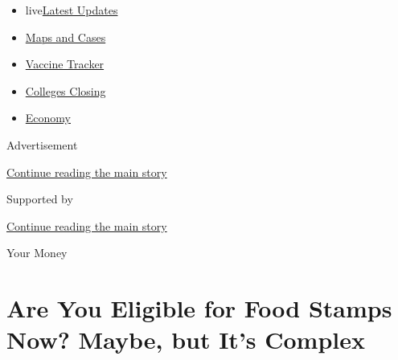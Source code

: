 \begin{itemize}
\tightlist
\item
  live\href{https://www.nytimes3xbfgragh.onion/2020/08/20/world/coronavirus-covid.html?name=styln-coronavirus-national\&region=TOP_BANNER\&variant=undefined\&block=storyline_menu_recirc\&action=click\&pgtype=Article\&impression_id=34c749a0-e386-11ea-9791-4976ace6e451}{Latest
  Updates}
\item
  \href{https://www.nytimes3xbfgragh.onion/interactive/2020/us/coronavirus-us-cases.html?name=styln-coronavirus-national\&region=TOP_BANNER\&variant=undefined\&block=storyline_menu_recirc\&action=click\&pgtype=Article\&impression_id=34c749a1-e386-11ea-9791-4976ace6e451}{Maps
  and Cases}
\item
  \href{https://www.nytimes3xbfgragh.onion/interactive/2020/science/coronavirus-vaccine-tracker.html?name=styln-coronavirus-national\&region=TOP_BANNER\&variant=undefined\&block=storyline_menu_recirc\&action=click\&pgtype=Article\&impression_id=34c749a2-e386-11ea-9791-4976ace6e451}{Vaccine
  Tracker}
\item
  \href{https://www.nytimes3xbfgragh.onion/2020/08/19/us/colleges-closing-covid.html?name=styln-coronavirus-national\&region=TOP_BANNER\&variant=undefined\&block=storyline_menu_recirc\&action=click\&pgtype=Article\&impression_id=34c749a3-e386-11ea-9791-4976ace6e451}{Colleges
  Closing}
\item
  \href{https://www.nytimes3xbfgragh.onion/live/2020/08/20/business/stock-market-today-coronavirus?name=styln-coronavirus-national\&region=TOP_BANNER\&variant=undefined\&block=storyline_menu_recirc\&action=click\&pgtype=Article\&impression_id=34c749a4-e386-11ea-9791-4976ace6e451}{Economy}
\end{itemize}

Advertisement

\protect\hyperlink{after-top}{Continue reading the main story}

Supported by

\protect\hyperlink{after-sponsor}{Continue reading the main story}

Your Money

\hypertarget{are-you-eligible-for-food-stamps-now-maybe-but-its-complex}{%
\section{Are You Eligible for Food Stamps Now? Maybe, but It's
Complex}\label{are-you-eligible-for-food-stamps-now-maybe-but-its-complex}}

